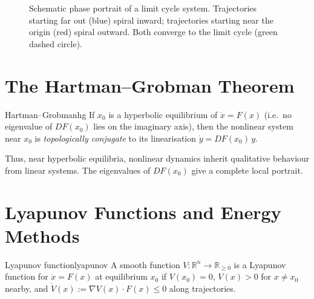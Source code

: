 \documentclass[12pt,openany]{book}
\newcommand{\R}{\mathbb{R}}
\begin{document}
\begin{figure}[H]
\centering
{}
\caption{Schematic phase portrait of a limit cycle system. Trajectories
starting far out (blue) spiral inward; trajectories starting near the origin
(red) spiral outward. Both converge to the limit cycle (green dashed circle).}
\label{fig:limitcycle}
\end{figure}

\section{The Hartman--Grobman Theorem}

\begin{theorem}{Hartman--Grobman}{hg}
  If $x_0$ is a hyperbolic equilibrium of $\dot x = F(x)$ (i.e.\ no
  eigenvalue of $DF(x_0)$ lies on the imaginary axis), then the nonlinear
  system near $x_0$ is \emph{topologically conjugate} to its linearisation
  $\dot y = DF(x_0)\,y$.
\end{theorem}

Thus, near hyperbolic equilibria, nonlinear dynamics inherit qualitative
behaviour from linear systems. The eigenvalues of $DF(x_0)$ give a complete
local portrait.

\section{Lyapunov Functions and Energy Methods}

\begin{definition}{Lyapunov function}{lyapunov}
  A smooth function $V:\R^n\to\R_{\ge 0}$ is a Lyapunov function for
  $\dot x=F(x)$ at equilibrium $x_0$ if $V(x_0)=0$, $V(x)>0$ for $x\neq x_0$
  nearby, and $\dot V(x) := \nabla V(x)\cdot F(x) \le 0$ along trajectories.
\end{definition}
\end{document}
